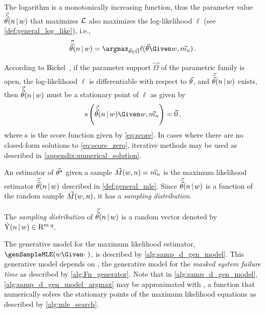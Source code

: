 \documentclass[ ../main.tex]{subfiles}
\begin{document}
The logarithm is a monotonically increasing function, thus the parameter value $\vec{\hat{\vec{\theta}}}(n {\,|\,} w)$ that maximizes $\operatorname{\mathcal{L}}$ also maximizes the log-likelihood $\ell$ (see \cref{def:general_log_like}), i.e.,
\begin{equation}
\label{eq:general_mle}
\mle = \argmax_{\sysparamvec \in \vec\Omega} \ell(\sysparamvec \Given w, \mfso)\,.
\end{equation}

According to Bickel~\cite{bickel}, if the parameter support $\vec\Omega$ of the parametric family is open, the log-likelihood $\ell$ is differentiable with respect to $\vec{\theta}$, and $\vec{\hat{\vec{\theta}}}(n {\,|\,} w)$ exists, then $\vec{\hat{\vec{\theta}}}(n {\,|\,} w)$ must be a stationary point of $\ell$ as given by
\begin{equation}
\label{eq:score_zero}
\score\left(\mle \Given w, \mfso\right) = \vec{0}\,,
\end{equation}
where $\operatorname{\rm{s}}$ is the score function given by \cref{eq:score}. In cases where there are no closed-form solutions to \cref{eq:score_zero}, iterative methods may be used as described in \cref{appendix:numerical_solution}.

An estimator of ${\vec{\theta}}^{\star}$ given a sample $\vec{M}(w,n) = \vec{m_n}$ is the maximum likelihood estimator $\vec{\hat{\vec{\theta}}}(n {\,|\,} w)$ described in \cref{def:general_mle}. Since $\vec{\hat{\vec{\theta}}}(n {\,|\,} w)$ is a function of the random sample $\vec{M}(w,n)$, it has a \emph{sampling distribution}.
\begin{definition}
The \emph{sampling distribution} of $\vec{\hat{\vec{\theta}}}(n {\,|\,} w)$ is a random vector denoted by $\mathrm{\vec{Y}}(n {\,|\,} w) \in \mathrm{R}^{m \cdot q}$.
\end{definition}

\sloppy
The generative model for the maximum likelihood estimator, $\genSampleMLE(w \Given \cdot\;)$, is described by \cref{alg:samp_d_gen_model}. This generative model depends on \genSampleFn, the generative model for the \emph{masked system failure time} as described by \cref{alg:Fn_generator}. Note that in \cref{alg:samp_d_gen_model}, \cref{alg:samp_d_gen_model_argmax} may be approximated with \findmle, a function that numerically solves the stationary points of the maximum likelihood equations as described by \cref{alg:mle_search}.
\end{document}
